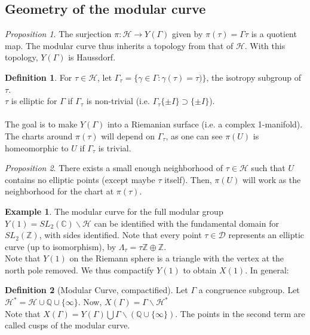 \documentclass[11pt]{article}
\theoremstyle{plain}
\theoremstyle{definition}
\newtheorem{definition}{Definition}[section]
\theoremstyle{example}
\newtheorem{example}{Example}[section]
\theoremstyle{remark}
\theoremstyle{lemma}
\theoremstyle{proposition}
\newtheorem{proposition}{Proposition}[section]
\theoremstyle{Problem}
\theoremstyle{Solution}
\theoremstyle{theorem}
\theoremstyle{corollary}
\begin{document}
\newpage

\subsection{Geometry of the modular curve}
\begin{proposition}
The surjection $\pi : \mathcal{H} \to Y(\Gamma)$ given by $\pi(\tau) = \Gamma \tau$ is a quotient map. The modular curve thus inherits a topology from that of $\mathcal{H}$. With this topology, $Y(\Gamma)$ is Haussdorf.  
\end{proposition}

\begin{definition}
For $\tau\in \mathcal{H}$, let $\Gamma_\tau = \{ \gamma \in \Gamma : \gamma(\tau) = \tau) \}$, the isotropy subgroup of $\tau$.\\
$\tau$ is elliptic for $\Gamma$ if $\Gamma_\tau$ is non-trivial (i.e. $\Gamma_\tau \{\pm I\} \supset \{\pm I\}$).\\ \\

The goal is to make $Y(\Gamma)$ into a Riemanian surface (i.e. a complex 1-manifold). The charts around $\pi(\tau)$ will depend on $\Gamma_\tau$, as one can see $\pi(U)$ is homeomorphic to $U$ if $\Gamma_\tau$ is trivial.
\end{definition}
\begin{proposition}
There exists a small enough neighborhood of $\tau \in \mathcal{H}$ such that $U$ contains no elliptic points (except maybe $\tau$ itself). Then, $\pi(U)$ will work as the neighborhood for the chart at $\pi(\tau)$.
\end{proposition}

\begin{example}
The modular curve for the full modular group $Y(1) = SL_2(\mathbb{C})\backslash \mathcal{H}$ can be identified with the fundamental domain for $SL_2(\mathbb{Z})$, with sides identified.
Note that every point $\tau \in \mathcal{D}$ represents an elliptic curve (up to isomorphism), by $\Lambda_\tau = \tau\mathbb{Z}\oplus\mathbb{Z}$.\\
Note that $Y(1)$ on the Riemann sphere is a triangle with the vertex at the north pole removed. We thus compactify $Y(1)$ to obtain $X(1)$. In general:
\end{example}

\begin{definition}[Modular Curve, compactified]
Let $\Gamma$ a congruence subgroup. Let $\mathcal{H}^* = \mathcal{H}\cup \mathbb{Q}\cup \{\infty\}$. Now, $X(\Gamma) = \Gamma\backslash\mathcal{H}^*$\\
 Note that $X(\Gamma) = Y(\Gamma) \bigcup \Gamma\backslash(\mathbb{Q}\cup\{\infty\})$. The points in the second term are called cusps of the modular curve.
\end{definition}
\end{document}
